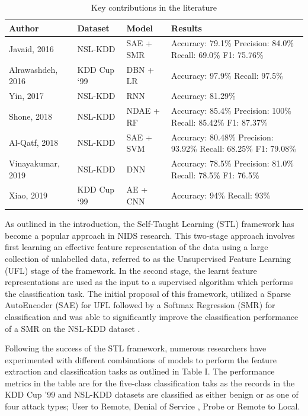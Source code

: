 \documentclass[conference]{IEEEtran}
\begin{document}
\begin{table}[htbp]
\caption{Key contributions in the literature}
\begin{center}
\begin{tabular}{|p{1.5cm}|p{1.8cm}|p{1.5cm}|p{2.1cm}|}
\hline
\textbf{Author} & \textbf{Dataset} & \textbf{Model} & \textbf{Results}\\[2pt]
\hline

Javaid, 2016 \cite{b2}  & NSL-KDD & SAE + SMR&
Accuracy: 79.1\% Precision: 84.0\% Recall: 69.0\%  F1: 75.76\%
\\[5pt]
\hline
Alrawashdeh, 2016 \cite{b6} & KDD Cup ‘99 & DBN + LR & Accuracy: 97.9\% Recall: 97.5\%\\[10pt]
\hline
Yin, 2017 & NSL-KDD & RNN&
Accuracy: 81.29\% \\[5pt]
\hline
Shone, 2018 \cite{b10} & NSL-KDD & NDAE + RF & 
Accuracy: 85.4\% Precision: 100\% Recall: 85.42\% F1: 87.37\%\\
\hline 
Al-Qatf, 2018 & NSL-KDD & SAE + SVM & 
Accuracy: 80.48\% Precision: 93.92\% Recall: 68.25\% F1: 79.08\%\\
\hline
Vinayakumar, 2019 & NSL-KDD & DNN &
Accuracy: 78.5\%  Precision: 81.0\% Recall: 78.5\% F1: 76.5\% \\ 
\hline 
Xiao, 2019 & KDD Cup ‘99 & AE + CNN & 
Accuracy: 94\% Recall: 93\% \\
\hline 
\end{tabular}
\label{tab1}
\end{center}
\end{table}

As outlined in the introduction, the Self-Taught Learning (STL) framework has become a popular approach in NIDS research. This two-stage approach involves first learning an effective feature representation of the data using a large collection of unlabelled data, referred to as the Unsupervised Feature Learning (UFL) stage of the framework. In the second stage, the learnt feature representations are used as the input to a supervised algorithm which performs the classification task. The initial proposal of this framework, utilized a Sparse AutoEncoder (SAE) for UFL followed by a Softmax Regression (SMR) for classification and was able to significantly improve the classification performance of a SMR on the NSL-KDD dataset\cite{b2} . 

Following the success of the STL framework, numerous researchers have experimented with different combinations of models to perform the feature extraction and classification tasks as outlined in Table I. The performance metrics in the table are for the five-class classification taks as the records in the KDD Cup '99 and NSL-KDD datasets are classified as either benign or as one of four attack types; User to Remote, Denial of Service , Probe or Remote to Local.
\end{document}
